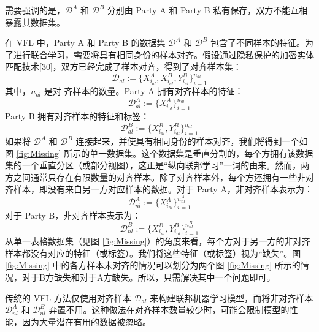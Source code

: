 需要强调的是，$\mathcal{D}^A$ 和 $\mathcal{D}^B$ 分别由 Party A 和 Party B 私有保存，双方不能互相暴露其数据集。

在 VFL 中，Party A 和 Party B 的数据集 $\mathcal{D}^A$ 和 $\mathcal{D}^B$ 包含了不同样本的特征。为了进行联合学习，需要将具有相同身份的样本对齐。假设通过隐私保护的加密实体匹配技术[30]，双方已经完成了样本对齐，得到了对齐样本集：
\begin{equation}
	\mathcal{D}_{al} := \{X^A_{i_{al}}, X^B_{i_{al}}, Y^B_{i_{al}}\}_{i=1}^{n_{al}}
\end{equation}
其中，$n_{al}$ 是对 齐样本的数量。Party A 拥有对齐样本的特征：
\begin{equation}
	\mathcal{D}^A_{al} := \{X^A_{i_{al}}\}_{i=1}^{n_{al}}
\end{equation}
Party B 拥有对齐样本的特征和标签：
\begin{equation}
	\mathcal{D}^B_{al} := \{X^B_{i_{al}}, Y^B_{i_{al}}\}_{i=1}^{n_{al}}
\end{equation}
如果将 $\mathcal{D}^A$ 和 $\mathcal{D}^B$ 连接起来，并使具有相同身份的样本对齐，我们将得到一个如图 \ref{fig:Missing} 所示的单一数据集。这个数据集是垂直分割的，每个方拥有该数据集的一个垂直分区（或部分视图），这正是“纵向联邦学习”一词的由来。然而，两方之间通常只存在有限数量的对齐样本。除了对齐样本外，每个方还拥有一些非对齐样本，即没有来自另一方对应样本的数据。对于 Party A，非对齐样本表示为：
\begin{equation}
	\mathcal{D}^A_{nl} := \{X^A_{i_{nl}}\}_{i=1}^{n^A_{nl}}
\end{equation}
对于 Party B，非对齐样本表示为：
\begin{equation}
	\mathcal{D}^B_{nl} := \{X^B_{i_{nl}}, Y^B_{i_{nl}}\}_{i=1}^{n^B_{nl}}
\end{equation}
从单一表格数据集（见图 \ref{fig:Missing}）的角度来看，每个方对于另一方的非对齐样本都没有对应的特征（或标签）。我们将这些特征（或标签）视为“缺失”。图 \ref{fig:Missing} 中的各方样本未对齐的情况可以划分为两个图 \ref{fig:Missing} 所示的情况，对于B方缺失和对于A方缺失。所以，只需解决其中一个问题即可。

传统的 VFL 方法仅使用对齐样本 $\mathcal{D}_{al}$ 来构建联邦机器学习模型，而将非对齐样本 $\mathcal{D}^A_{nl}$ 和 $\mathcal{D}^B_{nl}$ 弃置不用。这种做法在对齐样本数量较少时，可能会限制模型的性能，因为大量潜在有用的数据被忽略。

